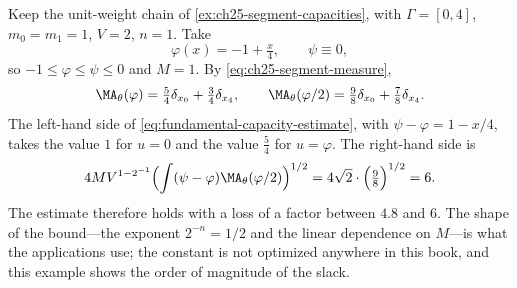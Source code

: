 \begin{example}
\label{ex:ch25-fundamental-numbers}
Keep the unit-weight chain of \cref{ex:ch25-segment-capacities},
with \(\Gamma=[0,4]\), \(m_0=m_1=1\), \(V=2\), \(n=1\).  Take
\[
 \varphi(x)=-1+\tfrac x4,\qquad \psi\equiv0,
\]
so \(-1\leq\varphi\leq\psi\leq0\) and \(M=1\).  By
\eqref{eq:ch25-segment-measure},
\[
 \MA_\theta(\varphi)=\tfrac54\delta_{x_0}+\tfrac34\delta_{x_4},
 \qquad
 \MA_\theta(\varphi/2)=\tfrac98\delta_{x_0}+\tfrac78\delta_{x_4}.
\]
The left-hand side of \eqref{eq:fundamental-capacity-estimate}, with
\(\psi-\varphi=1-x/4\), takes the value \(1\) for \(u=0\) and the value
\(\tfrac54\) for \(u=\varphi\).  The right-hand side is
\[
 4MV^{1-2^{-1}}\Bigl(\int(\psi-\varphi)\MA_\theta(\varphi/2)\Bigr)^{1/2}
 =4\sqrt2\cdot\Bigl(\tfrac98\Bigr)^{1/2}=6 .
\]
The estimate therefore holds with a loss of a factor between \(4.8\) and
\(6\).  The shape of the bound---the exponent \(2^{-n}=1/2\) and the linear
dependence on \(M\)---is what the applications use; the constant is not
optimized anywhere in this book, and this example shows the order of
magnitude of the slack.
\end{example}

